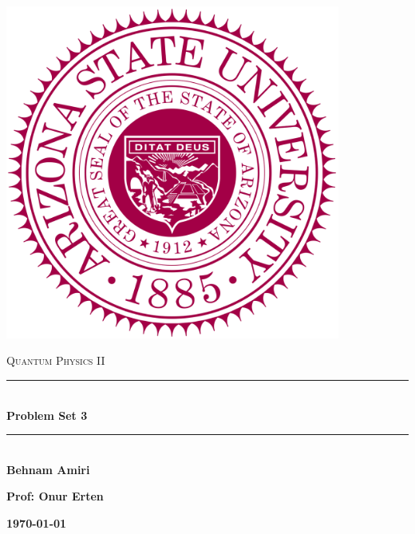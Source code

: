 \documentclass[fleqn]{article}
\begin{document}
  \begin{titlepage}

    \newcommand{\HRule}{\rule{\linewidth}{0.5mm}}

    \center

    \begin{center}
      \includegraphics[height=11cm, width=11cm]{asu.png}
    \end{center}

    \vline

    \textsc{\LARGE Quantum Physics II}\\[1.5cm]

    \HRule \\[0.5cm]
    { \huge \bfseries Problem Set 3}\\[0.4cm] 
    \HRule \\[1.0cm]

    \textbf{Behnam Amiri}

    \bigbreak

    \textbf{Prof: Onur Erten}

    \bigbreak

    \textbf{{\large \today}\\[2cm]}

    \vfill

  \end{titlepage}
\end{document}
